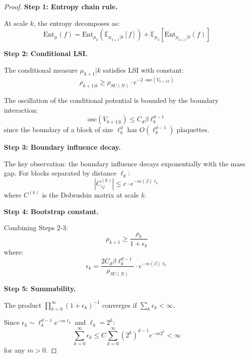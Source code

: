 \begin{proof}
\textbf{Step 1: Entropy chain rule.}

At scale $k$, the entropy decomposes as:
\begin{equation}
\text{Ent}_\mu(f) = \text{Ent}_{\mu_k}(\mathbb{E}_{\mu_{k+1}|k}[f]) + 
\mathbb{E}_{\mu_k}[\text{Ent}_{\mu_{k+1}|k}(f)]
\end{equation}

\textbf{Step 2: Conditional LSI.}

The conditional measure $\mu_{k+1}|k$ satisfies LSI with constant:
\begin{equation}
\rho_{k+1|k} \geq \rho_{SU(N)} \cdot e^{-2 \cdot \text{osc}(V_{k+1|k})}
\end{equation}

The oscillation of the conditional potential is bounded by the boundary interaction:
\begin{equation}
\text{osc}(V_{k+1|k}) \leq C_d \beta \ell_k^{d-1}
\end{equation}
since the boundary of a block of size $\ell_k^d$ has $O(\ell_k^{d-1})$ plaquettes.

\textbf{Step 3: Boundary influence decay.}

The key observation: the boundary influence decays exponentially with the mass gap.
For blocks separated by distance $\ell_k$:
\begin{equation}
|C_{ij}^{(k)}| \leq c \cdot e^{-m(\beta) \ell_k}
\end{equation}
where $C^{(k)}$ is the Dobrushin matrix at scale $k$.

\textbf{Step 4: Bootstrap constant.}

Combining Steps 2-3:
\begin{equation}
\rho_{k+1} \geq \frac{\rho_k}{1 + \epsilon_k}
\end{equation}
where:
\begin{equation}
\epsilon_k = \frac{2 C_d \beta \ell_k^{d-1}}{\rho_{SU(N)}} \cdot e^{-m(\beta) \ell_k}
\end{equation}

\textbf{Step 5: Summability.}

The product $\prod_{k=0}^\infty (1 + \epsilon_k)^{-1}$ converges if $\sum_k \epsilon_k < \infty$.

Since $\epsilon_k \sim \ell_k^{d-1} e^{-m \ell_k}$ and $\ell_k = 2^k$:
\begin{equation}
\sum_{k=0}^\infty \epsilon_k \leq C \sum_{k=0}^\infty (2^k)^{d-1} e^{-m 2^k} < \infty
\end{equation}
for any $m > 0$.


\end{proof}

